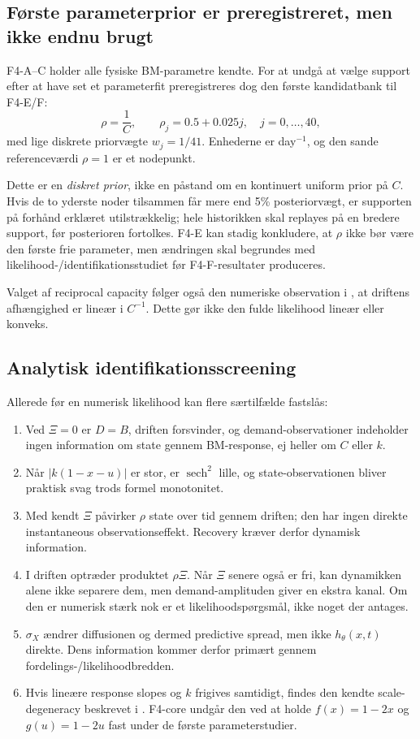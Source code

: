 \subsection{Første parameterprior er preregistreret, men ikke endnu brugt}

F4-A--C holder alle fysiske BM-parametre kendte. For at undgå at vælge support efter at
have set et parameterfit preregistreres dog den første kandidatbank til F4-E/F:
\[
 \rho=\frac1C,\qquad
 \rho_j=0.5+0.025j,\quad j=0,\ldots,40,
\]
med lige diskrete priorvægte \(w_j=1/41\). Enhederne er day\(^{-1}\), og den sande
referenceværdi \(\rho=1\) er et nodepunkt.

Dette er en \emph{diskret prior}, ikke en påstand om en kontinuert uniform prior på
\(C\). Hvis de to yderste noder tilsammen får mere end 5\% posteriorvægt, er supporten
på forhånd erklæret utilstrækkelig; hele historikken skal replayes på en bredere support,
før posterioren fortolkes. F4-E kan stadig konkludere, at \(\rho\) ikke bør være den
første frie parameter, men ændringen skal begrundes med likelihood-/identifikationsstudiet
før F4-F-resultater produceres.

Valget af reciprocal capacity følger også den numeriske observation i \cite{alba},
at driftens afhængighed er lineær i \(C^{-1}\). Dette gør ikke den fulde likelihood
lineær eller konveks.

\subsection{Analytisk identifikationsscreening}

Allerede før en numerisk likelihood kan flere særtilfælde fastslås:

\begin{enumerate}
\item Ved \(\Xi=0\) er \(D=B\), driften forsvinder, og demand-observationer indeholder
ingen information om state gennem BM-response, ej heller om \(C\) eller \(k\).
\item Når \(|k(1-x-u)|\) er stor, er \(\operatorname{sech}^2\) lille, og
state-observationen bliver praktisk svag trods formel monotonitet.
\item Med kendt \(\Xi\) påvirker \(\rho\) state over tid gennem driften; den har ingen
direkte instantaneous observationseffekt. Recovery kræver derfor dynamisk information.
\item I driften optræder produktet \(\rho\Xi\). Når \(\Xi\) senere også er fri, kan
dynamikken alene ikke separere dem, men demand-amplituden giver en ekstra kanal.
Om den er numerisk stærk nok er et likelihoodspørgsmål, ikke noget der antages.
\item \(\sigma_X\) ændrer diffusionen og dermed predictive spread, men ikke
\(h_\theta(x,t)\) direkte. Dens information kommer derfor primært gennem
fordelings-/likelihoodbredden.
\item Hvis lineære response slopes og \(k\) frigives samtidigt, findes den kendte
scale-degeneracy beskrevet i \cite{alba}. F4-core undgår den ved at holde
\(f(x)=1-2x\) og \(g(u)=1-2u\) fast under de første parameterstudier.
\end{enumerate}

